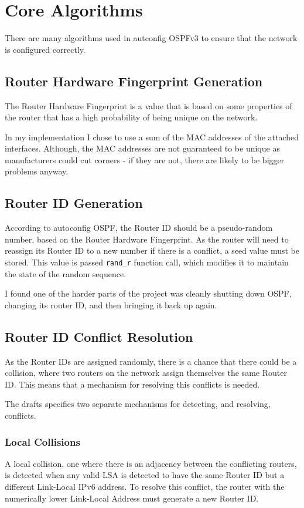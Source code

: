 \documentclass[12pt]{report}
\begin{document}
\section{Core Algorithms}
There are many algorithms used in autconfig OSPFv3 to ensure that the network
is configured correctly.

\subsection{Router Hardware Fingerprint Generation}
The Router Hardware Fingerprint is a value that is based on some properties of
the router that has a high probability of being unique on the network. 

In my implementation I chose to use a sum of the MAC  addresses of the attached interfaces.
Although, the MAC addresses are not guaranteed to be unique as manufacturers
could cut corners - if they are not, there are likely to be bigger problems
anyway.

\subsection{Router ID Generation}
According to autoconfig OSPF, the Router ID should be a pseudo-random number,
based on the Router Hardware Fingerprint. As the router will need to reassign
its Router ID to a new number if there is a conflict, a seed value must be
stored. This value is passed \texttt{rand\_r} function call, which modifies it to
maintain the state of the random sequence.

I found one of the harder parts of the project was cleanly shutting down OSPF,
changing its router ID, and then bringing it back up again. 

\subsection{Router ID Conflict Resolution}
As the Router IDs are assigned randomly, there is a chance that there could be
a collision, where two routers on the network assign themselves the same Router
ID\@.  This means that a mechanism for resolving this conflicts is needed. 

The drafts specifies two separate mechanisms for detecting, and resolving,
conflicts. 

\subsubsection{Local Collisions}
A local collision, one where there is an adjacency between the conflicting
routers, is detected when any valid LSA is detected to have the same Router ID
but a different Link-Local IPv6 address. To resolve this conflict, the router
with the numerically lower Link-Local Address must generate a new Router ID\@. 
\end{document}

